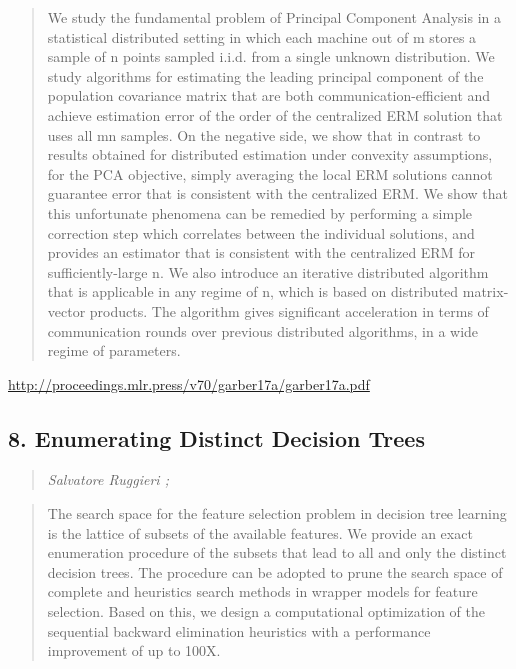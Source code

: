 \documentclass{article}
\begin{document}
\begin{quote}
    We study the fundamental problem of Principal Component Analysis in a statistical distributed setting in which each machine out of m stores a sample of n points sampled i.i.d. from a single unknown distribution. We study algorithms for estimating the leading principal component of the population covariance matrix that are both communication-efficient and achieve estimation error of the order of the centralized ERM solution that uses all mn samples. On the negative side, we show that in contrast to results obtained for distributed estimation under convexity assumptions, for the PCA objective, simply averaging the local ERM solutions cannot guarantee error that is consistent with the centralized ERM. We show that this unfortunate phenomena can be remedied by performing a simple correction step which correlates between the individual solutions, and provides an estimator that is consistent with the centralized ERM for sufficiently-large n. We also introduce an iterative distributed algorithm that is applicable in any regime of n, which is based on distributed matrix-vector products. The algorithm gives significant acceleration in terms of communication rounds over previous distributed algorithms, in a wide regime of parameters.  
\end{quote}

\href{http://proceedings.mlr.press/v70/garber17a/garber17a.pdf}{http://proceedings.mlr.press/v70/garber17a/garber17a.pdf}

\subsection{8. Enumerating Distinct Decision Trees}

\begin{quote}
\footnotesize{\textit{Salvatore Ruggieri ;}}

\end{quote}

\begin{quote}
    The search space for the feature selection problem in decision tree learning is the lattice of subsets of the available features. We provide an exact enumeration procedure of the subsets that lead to all and only the distinct decision trees. The procedure can be adopted to prune the search space of complete and heuristics search methods in wrapper models for feature selection. Based on this, we design a computational optimization of the sequential backward elimination heuristics with a performance improvement of up to 100X.  
\end{quote}
\end{document}
